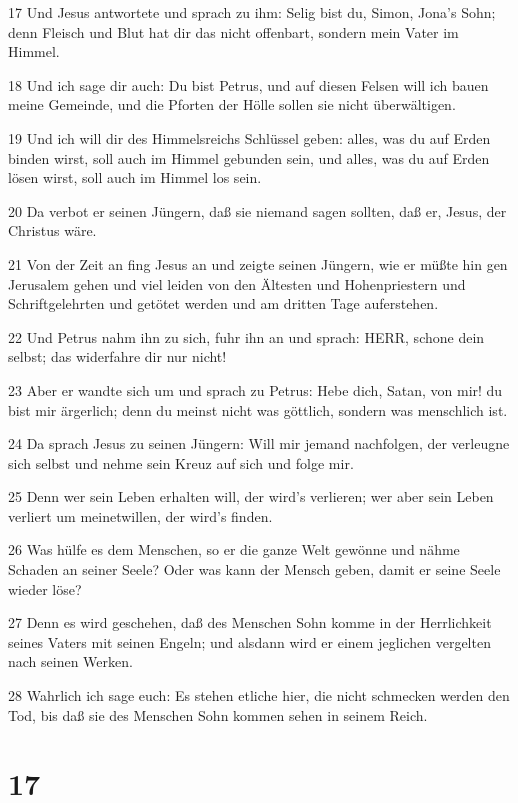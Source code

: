 \par 17 Und Jesus antwortete und sprach zu ihm: Selig bist du, Simon, Jona's Sohn; denn Fleisch und Blut hat dir das nicht offenbart, sondern mein Vater im Himmel.
\par 18 Und ich sage dir auch: Du bist Petrus, und auf diesen Felsen will ich bauen meine Gemeinde, und die Pforten der Hölle sollen sie nicht überwältigen.
\par 19 Und ich will dir des Himmelsreichs Schlüssel geben: alles, was du auf Erden binden wirst, soll auch im Himmel gebunden sein, und alles, was du auf Erden lösen wirst, soll auch im Himmel los sein.
\par 20 Da verbot er seinen Jüngern, daß sie niemand sagen sollten, daß er, Jesus, der Christus wäre.
\par 21 Von der Zeit an fing Jesus an und zeigte seinen Jüngern, wie er müßte hin gen Jerusalem gehen und viel leiden von den Ältesten und Hohenpriestern und Schriftgelehrten und getötet werden und am dritten Tage auferstehen.
\par 22 Und Petrus nahm ihn zu sich, fuhr ihn an und sprach: HERR, schone dein selbst; das widerfahre dir nur nicht!
\par 23 Aber er wandte sich um und sprach zu Petrus: Hebe dich, Satan, von mir! du bist mir ärgerlich; denn du meinst nicht was göttlich, sondern was menschlich ist.
\par 24 Da sprach Jesus zu seinen Jüngern: Will mir jemand nachfolgen, der verleugne sich selbst und nehme sein Kreuz auf sich und folge mir.
\par 25 Denn wer sein Leben erhalten will, der wird's verlieren; wer aber sein Leben verliert um meinetwillen, der wird's finden.
\par 26 Was hülfe es dem Menschen, so er die ganze Welt gewönne und nähme Schaden an seiner Seele? Oder was kann der Mensch geben, damit er seine Seele wieder löse?
\par 27 Denn es wird geschehen, daß des Menschen Sohn komme in der Herrlichkeit seines Vaters mit seinen Engeln; und alsdann wird er einem jeglichen vergelten nach seinen Werken.
\par 28 Wahrlich ich sage euch: Es stehen etliche hier, die nicht schmecken werden den Tod, bis daß sie des Menschen Sohn kommen sehen in seinem Reich.

\chapter{17}

